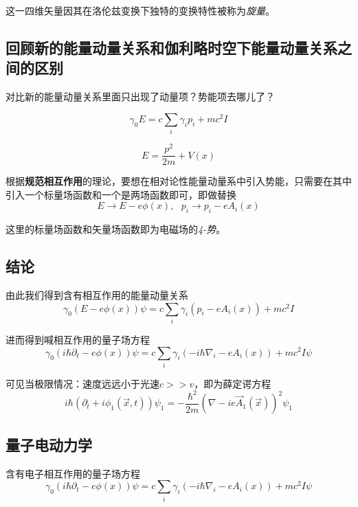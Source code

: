 这一四维矢量因其在洛伦兹变换下独特的变换特性被称为\textsl{旋量}。

\subsection*{回顾新的能量动量关系和伽利略时空下能量动量关系之间的区别}

对比新的能量动量关系里面只出现了动量项？势能项去哪儿了？

\begin{equation}
    \gamma_0E=c\sum_i \gamma_ip_i+mc^2I
\end{equation}

\begin{equation}
    E=\frac{p^2}{2m}+V(x)
\end{equation}

根据\textbf{规范相互作用}的理论，要想在相对论性能量动量系中引入势能，只需要在其中引入一个标量场函数和一个是两场函数即可，即做替换
\begin{equation}
    E\rightarrow E-e\phi(x),\ \ \ p_i\rightarrow p_i-eA_i(x)
\end{equation}

这里的标量场函数和矢量场函数即为电磁场的\textsl{4-势}。

\subsection*{结论}

由此我们得到含有相互作用的能量动量关系
\begin{equation}
    \gamma_0(E-e\phi(x))\psi=c\sum_i\gamma_i(p_i-eA_i(x))+mc^2I
\end{equation}

进而得到喊相互作用的量子场方程
\begin{equation}
    \gamma_0(i\hbar \partial_t-e\phi(x))\psi=c\sum_i\gamma_i(-i\hbar\nabla_i-eA_i(x))+mc^2I\psi
\end{equation}

可见当极限情况：速度远远小于光速$c>>v$，即为薛定谔方程
\begin{equation}
    i\hbar(\partial_t+i\phi_1(\vec{x},t))\psi_1=-\frac{\hbar^2}{2m}(\nabla-ie\vec{A}_1(\vec{x}))^2\psi_1
\end{equation}

\subsection*{量子电动力学}

含有电子相互作用的量子场方程
\begin{equation}
    \gamma_0(i\hbar \partial_t-e\phi(x))\psi=c\sum_i\gamma_i(-i\hbar\nabla_i-eA_i(x))+mc^2I\psi
\end{equation}

